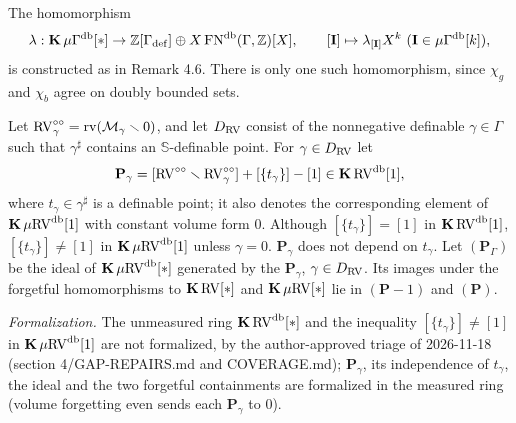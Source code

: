 \setcounter{theorem}{11}
\begin{definition}
\label{db-gam-fn}
\leanok
{}
The homomorphism \[ \lambda : \ggk \mG^{\db}[*] \to \Z[\Gamma_{\mathrm{def}}] \oplus X \operatorname{FN}^{\db}(\Gamma, \Z)[X], \qquad [\mathbf{I}] \mapsto \lambda_{[\mathbf{I}]} X^k \ (\mathbf{I} \in \mG^{\db}[k]), \] is constructed as in Remark 4.6. There is only one such homomorphism, since $\chi_g$ and $\chi_b$ agree on doubly bounded sets.
\end{definition}

\setcounter{theorem}{12}
\begin{definition}
\label{pgammabis}
\leanok
{}
Let $\mathrm{RV}^{\circ\circ}_\gamma = \operatorname{rv}(\mathcal{M}_\gamma \smallsetminus 0)$, and let $D_{\mathrm{RV}}$ consist of the nonnegative definable $\gamma \in \Gamma$ such that $\gamma^\sharp$ contains an $\mathbb{S}$-definable point. For $\gamma \in D_{\mathrm{RV}}$ let \[ \mathbf{P}_\gamma = [\mathrm{RV}^{\circ\circ} \smallsetminus \mathrm{RV}^{\circ\circ}_\gamma] + [\{t_\gamma\}] - [1] \in \operatorname{\mathbf{K}} \mathrm{RV}^{\operatorname{db}}[1], \] where $t_\gamma \in \gamma^\sharp$ is a definable point; it also denotes the corresponding element of $\operatorname{\mathbf{K}} \mu\mathrm{RV}^{\operatorname{db}}[1]$ with constant volume form $0$. Although $[\{t_\gamma\}] = [1]$ in $\operatorname{\mathbf{K}} \mathrm{RV}^{\operatorname{db}}[1]$, $[\{t_\gamma\}] \neq [1]$ in $\operatorname{\mathbf{K}} \mu\mathrm{RV}^{\operatorname{db}}[1]$ unless $\gamma = 0$. $\mathbf{P}_\gamma$ does not depend on $t_\gamma$. Let $(\mathbf{P}_\Gamma)$ be the ideal of $\operatorname{\mathbf{K}} \mu\mathrm{RV}^{\operatorname{db}}[*]$ generated by the $\mathbf{P}_\gamma$, $\gamma \in D_{\mathrm{RV}}$. Its images under the forgetful homomorphisms to $\operatorname{\mathbf{K}} \mathrm{RV}[*]$ and $\operatorname{\mathbf{K}} \mu\mathrm{RV}[*]$ lie in $(\mathbf{P} - 1)$ and $(\mathbf{P})$.

\emph{Formalization.} The unmeasured ring $\operatorname{\mathbf{K}} \mathrm{RV}^{\operatorname{db}}[*]$ and the inequality $[\{t_\gamma\}] \neq [1]$ in $\operatorname{\mathbf{K}} \mu\mathrm{RV}^{\operatorname{db}}[1]$ are not formalized, by the author-approved triage of 2026-11-18 (section 4/GAP-REPAIRS.md and COVERAGE.md); $\mathbf{P}_\gamma$, its independence of $t_\gamma$, the ideal and the two forgetful containments are formalized in the measured ring (volume forgetting even sends each $\mathbf{P}_\gamma$ to $0$).
\end{definition}

